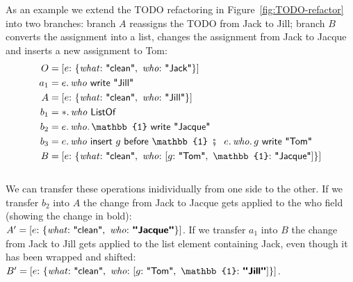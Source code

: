 \documentclass[english,submission]{programming}
\theoremstyle{definition}
\newcommand{\mathbox}[1]{\colorbox{black!10}{$#1$}}
\DeclareMathOperator{\exec}{\ \fatsemi\ \ }
\newcommand{\is}{{:}\ }
\newcommand{\comma}{,\ }
\newcommand{\quotedstring}[1]{\textsf{\textquotedbl{#1}\textquotedbl}}
\begin{document}
As an example we extend the TODO refactoring in Figure~\ref{fig:TODO-refactor} into two branches: branch $A$ reassigns the TODO from Jack to Jill; branch $B$ converts the assignment into a list, changes the assignment from Jack to Jacque and inserts a new assignment to Tom:
\begin{align*}
  O &= [
    e \is \{ \mathit{what}\is \quotedstring{clean}\comma  \mathit{who}\is \quotedstring{Jack} \}
    ] \\
  a_1 &= e\ldotp\mathit{who}\textsf{ write } \quotedstring{Jill}\\
  A &= [
    e \is \{ \mathit{what}\is \quotedstring{clean}\comma  \mathit{who}\is \quotedstring{Jill} \}
    ] \\
  b_1 &= *\ldotp \mathit{who} \textsf{ ListOf } \\
  b_2 &= e\ldotp\mathit{who}\ldotp\mathbb{1} \textsf{ write } \quotedstring{Jacque} \\
  b_3 &= e\ldotp\mathit{who} \textsf{ insert } g \textsf{ before } \mathbb{1} \exec e\ldotp\mathit{who}\ldotp g \textsf{ write } \quotedstring{Tom} \\
  B &= [
    e \is \{ \mathit{what}\is \quotedstring{clean}\comma  \mathit{who}\is
    [ g \is \quotedstring{Tom} \comma \mathbb{1}\is \quotedstring{Jacque}] \}
    ] \\
  \end{align*}
  \vspace{-30pt}\\
We can transfer these operations inidividually from one side to the other.
If we transfer $b_2$ into $A$ the change from Jack to Jacque gets applied to the \textsf{who} field (showing the change in bold):\\
\mathbox{A' =
[e \is \{ \mathit{what}\is \quotedstring{clean}\comma  \mathit{who}\is \textbf{\quotedstring{Jacque}} \}]}.
If we transfer $a_1$ into $B$ the change from Jack to Jill gets applied to the list element containing Jack, even though it has been wrapped and shifted:\\
\mathbox{B' = [
    e \is \{ \mathit{what}\is \quotedstring{clean}\comma  \mathit{who}\is
    [ g \is \quotedstring{Tom} \comma \mathbb{1}\is \textbf{\quotedstring{Jill}}] \}
]}.

\end{document}
